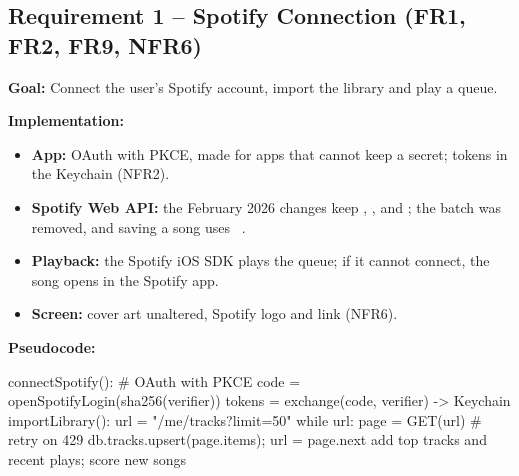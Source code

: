 \documentclass[conference]{IEEEtran}
\newcommand{\goal}[1]{\noindent\textbf{Goal:} #1\par\smallskip}
\newcommand{\impl}{\noindent\textbf{Implementation:}}
\newcommand{\pcode}{\noindent\textbf{Pseudocode:}}
\begin{document}
\subsection{Requirement 1 -- Spotify Connection (FR1, FR2, FR9, NFR6)}
\goal{Connect the user's Spotify account, import the library and play a queue.}
\impl
\begin{itemize}
\item \textbf{App:} OAuth with PKCE, made for apps that cannot keep a secret; tokens in the Keychain (NFR2).
\item \textbf{Spotify Web API:} the February 2026 changes keep , ,  and ; the batch  was removed, and saving a song uses ~\cite{spotify2026}.
\item \textbf{Playback:} the Spotify iOS SDK plays the queue; if it cannot connect, the song opens in the Spotify app.
\item \textbf{Screen:} cover art unaltered, Spotify logo and link (NFR6).
\end{itemize}
\par\noindent\begin{minipage}{\columnwidth}
\pcode
\begin{code}
connectSpotify():                  # OAuth with PKCE
  code   = openSpotifyLogin(sha256(verifier))
  tokens = exchange(code, verifier) -> Keychain
importLibrary():
  url = "/me/tracks?limit=50"
  while url:
    page = GET(url)                  # retry on 429
    db.tracks.upsert(page.items); url = page.next
  add top tracks and recent plays; score new songs
\end{code}
\end{minipage}\par
\end{document}
